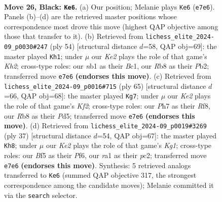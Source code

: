 \documentclass[11pt]{article}
\begin{document}
\clearpage

\begin{figure}[p]\centering
\begin{subfigure}{0.46\textwidth}\centering
\resizebox{\linewidth}{!}{%
\newchessgame
\chessboard[
  setfen={1r5r/4k1Qp/1p6/p4b2/7P/8/PP3PP1/RN4K1 b - - 0 26},
  showmover=false,
  pgfstyle=straightmove, color=movearrow, markmove={e7-e6}
]}
\caption{}
\end{subfigure}\hfill
\begin{subfigure}{0.46\textwidth}\centering
\resizebox{\linewidth}{!}{%
\newchessgame
\chessboard[
  setfen={R7/pp1kp3/2p5/3p2P1/6pP/8/PPP2q1K/R1B5 w - - 3 28},
  showmover=false,
  pgfstyle=straightmove, color=movearrow, markmove={h2-h1}
]}
\caption{}
\end{subfigure}
\\[4pt]
\begin{subfigure}{0.46\textwidth}\centering
\resizebox{\linewidth}{!}{%
\newchessgame
\chessboard[
  setfen={3r1r2/p4k2/1p6/3p1Q2/8/4P3/PP3P1P/7K b - - 3 33},
  showmover=false,
  pgfstyle=straightmove, color=movearrow, markmove={f7-g7}
]}
\caption{}
\end{subfigure}\hfill
\begin{subfigure}{0.46\textwidth}\centering
\resizebox{\linewidth}{!}{%
\newchessgame
\chessboard[
  setfen={r4rk1/8/p1p1Qp1p/8/3p4/3P4/PPP2PPP/R5K1 b - - 0 19},
  showmover=false,
  pgfstyle=straightmove, color=movearrow, markmove={g8-h8}
]}
\caption{}
\end{subfigure}
\caption{\textbf{Move 26, Black: \texttt{Ke6}.} (a) Our position; Melanie plays \texttt{Ke6} (\texttt{e7e6}). Panels (b)--(d) are the retrieved master positions whose correspondence most drove this move (highest QAP objective among those that transfer to it). (b) Retrieved from \texttt{lichess\_elite\_2024-09\_p0030\#247} (ply 54) [structural distance $d$=58, QAP obj=69]: the master played \texttt{Kh1}; under $\mu$ our \emph{Ke2} plays the role of that game's \emph{Kh2}; cross-type roles: our \emph{n}b1 as their \emph{B}c1, our \emph{R}b8 as their \emph{P}b2; transferred move \texttt{e7e6} \textbf{(endorses this move)}. (c) Retrieved from \texttt{lichess\_elite\_2024-09\_p0016\#715} (ply 65) [structural distance $d$=66, QAP obj=68]: the master played \texttt{Kg7}; under $\mu$ our \emph{Ke2} plays the role of that game's \emph{Kf2}; cross-type roles: our \emph{P}h7 as their \emph{R}f8, our \emph{R}b8 as their \emph{P}d5; transferred move \texttt{e7e6} \textbf{(endorses this move)}. (d) Retrieved from \texttt{lichess\_elite\_2024-09\_p0019\#3269} (ply 37) [structural distance $d$=54, QAP obj=67]: the master played \texttt{Kh8}; under $\mu$ our \emph{Ke2} plays the role of that game's \emph{Kg1}; cross-type roles: our \emph{B}f5 as their \emph{P}f6, our \emph{r}a1 as their \emph{p}c2; transferred move \texttt{e7e6} \textbf{(endorses this move)}. Synthesis: 5 retrieved analogs transferred to \texttt{Ke6} (summed QAP objective 317, the strongest correspondence among the candidate moves); Melanie committed it via the \texttt{search} selector.}
\label{fig:thought-m51}
\end{figure}
\end{document}
